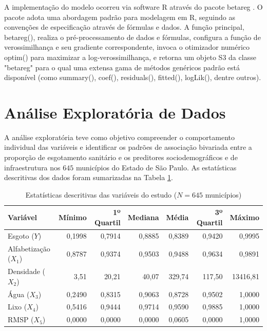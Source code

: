 \documentclass[12pt, a4paper]{article}
\begin{document}
A implementação do modelo ocorreu via software R através do pacote betareg \cite{JSSv034i02}. O pacote adota uma abordagem padrão para modelagem em R, seguindo as convenções de especificação através de fórmulas e dados. A função principal, betareg(), realiza o pré-processamento de dados e fórmulas, configura a função de verossimilhança e seu gradiente correspondente, invoca o otimizador numérico optim() para maximizar a log-verossimilhança, e retorna um objeto S3 da classe "betareg" para o qual uma extensa gama de métodos genéricos padrão está disponível (como summary(), coef(), residuals(), fitted(), logLik(), dentre outros). 

\section{Análise Exploratória de Dados}

A análise exploratória teve como objetivo compreender o comportamento individual das variáveis e identificar os padrões de associação bivariada entre a proporção de esgotamento sanitário e os preditores sociodemográficos e de infraestrutura nos $645$ municípios do Estado de São Paulo. As estatísticas descritivas dos dados foram sumarizadas na Tabela \ref{tab:estatisticas_descritivas}. 

\begin{table}[H]
\centering
\caption{Estatísticas descritivas das variáveis do estudo ($N = 645$ municípios)}
\label{tab:estatisticas_descritivas}
\begin{tabular}{lrrrrrr}
\toprule
\textbf{Variável} & \textbf{Mínimo} & \textbf{1º Quartil} & \textbf{Mediana} & \textbf{Média} & \textbf{3º Quartil} & \textbf{Máximo} \\
\midrule
Esgoto ($Y$)          & 0,1998 & 0,7914 & 0,8885 & 0,8389 & 0,9420 & 0,9995 \\
Alfabetização ($X_1$) & 0,8787 & 0,9374 & 0,9503 & 0,9488 & 0,9634 & 0,9891 \\
Densidade ($X_2$)     & 3,51   & 20,21  & 40,07  & 329,74 & 117,50 & 13416,81 \\
Água ($X_3$)          & 0,2490 & 0,8315 & 0,9063 & 0,8728 & 0,9502 & 1,0000 \\
Lixo ($X_4$)          & 0,5416 & 0,9444 & 0,9714 & 0,9590 & 0,9885 & 1,0000 \\
RMSP ($X_5$)          & 0,0000 & 0,0000 & 0,0000 & 0,0605 & 0,0000 & 1,0000 \\
\bottomrule
\end{tabular}
\end{table}
\end{document}
